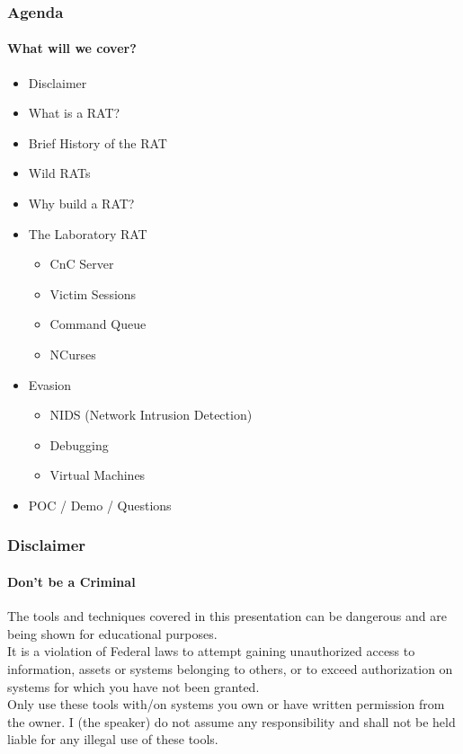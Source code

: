 \documentclass[aspectratio=169]{beamer}
\begin{document}
\begin{frame}
  \frametitle{Agenda}
  \framesubtitle{What will we cover?}
  \begin{itemize}
  \item{Disclaimer}
  \item{What is a RAT?}
  \item{Brief History of the RAT}
  \item{Wild RATs}
  \item{Why build a RAT?}
  \item{The Laboratory RAT}
    \begin{itemize}
    \item{CnC Server}
    \item{Victim Sessions}
    \item{Command Queue}
    \item{NCurses}
    \end{itemize}
  \item{Evasion}
    \begin{itemize}
    \item{NIDS (Network Intrusion Detection)}
    \item{Debugging}
    \item{Virtual Machines}
    \end{itemize}
  \item{POC / Demo / Questions}
  \end{itemize}
\end{frame}

\begin{frame}
  \frametitle{Disclaimer}
  \framesubtitle{Don't be a Criminal}
  \begin{tcolorbox}[title=disclaimer.log,colback=gray]
    The tools and techniques covered in this presentation can be dangerous and are\\
    being shown for educational purposes.\\
    \newline
    It is a violation of Federal laws to attempt gaining unauthorized access to information, assets or systems belonging to others, or to exceed authorization on systems for which you have not been granted.\\
    \newline
    Only use these tools with/on systems you own or have written permission from the owner. I (the speaker) do not assume any responsibility and shall not be held liable for any illegal use of these tools.\\
  \end{tcolorbox}
\end{frame}
\end{document}

